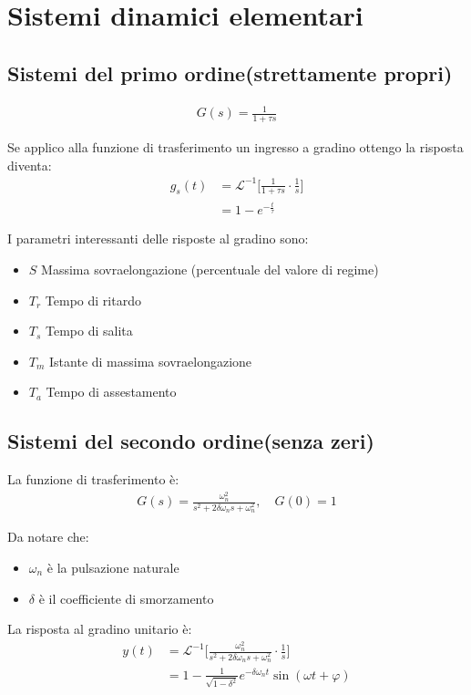 \section{Sistemi dinamici elementari} \label{sec:Sistemi dinamici elementari}

\subsection{Sistemi del primo ordine(strettamente propri)}


\begin{align}
  G(s) = \frac{1}{1 + \tau s}
\end{align}

Se applico alla funzione di trasferimento un ingresso a gradino ottengo la risposta diventa:
\begin{align}
  g_s(t) &= \mathcal{L}^{-1} \Big[ \frac{1}{1+\tau s} \cdot \frac{1}{s} \Big] \\
  &= 1 - e^{-\frac{t}{\tau}}
\end{align}

I parametri interessanti delle risposte al gradino sono:
\begin{itemize}
  \item $S$ Massima sovraelongazione (percentuale del valore di regime)
  \item $T_r$ Tempo di ritardo
  \item $T_s$ Tempo di salita
  \item $T_m$ Istante di massima sovraelongazione
  \item $T_a$ Tempo di assestamento
\end{itemize}


\subsection{Sistemi del secondo ordine(senza zeri)}

La funzione di trasferimento è:
\begin{align}
  G(s) = \frac{\omega_n^2}{s^2 + 2 \delta \omega_n s + \omega_n^2}, \quad G(0) = 1
\end{align}

Da notare che:
\begin{itemize}
  \item $\omega_n$ è la pulsazione naturale
  \item $\delta$ è il coefficiente di smorzamento
\end{itemize}

La risposta al gradino unitario è:
\begin{align}
  y(t) &= \mathcal{L}^{-1} \Big[  \frac{\omega_n^2}{s^2 + 2 \delta \omega_n s + \omega_n^2}  \cdot \frac{1}{s}\Big] \\
  &= 1 - \frac{1}{\sqrt{1-\delta^2}} e^{-\delta \omega_n t} \sin (\omega t + \varphi)
\end{align}


